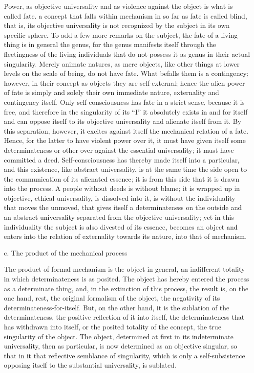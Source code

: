 Power, as objective universality and as violence against
the object is what is called fate.
a concept that falls within mechanism
in so far as fate is called blind,
that is, its objective universality is
not recognized by the subject in
its own specific sphere.
To add a few more remarks on the subject,
the fate of a living thing is in general the genus,
for the genus manifests itself through the fleetingness of
the living individuals that do not possess it as genus
in their actual singularity.
Merely animate natures, as mere objects,
like other things at lower levels
on the scale of being,
do not have fate.
What befalls them is a contingency;
however, in their concept as objects
they are self-external;
hence the alien power of fate is
simply and solely their own immediate nature,
externality and contingency itself.
Only self-consciousness has fate in a strict sense,
because it is free,
and therefore in the singularity of its “I”
it absolutely exists in and for itself
and can oppose itself to its objective universality
and alienate itself from it.
By this separation, however, it excites against itself
the mechanical relation of a fate.
Hence, for the latter to have violent power over it,
it must have given itself some determinateness or other
over against the essential universality;
it must have committed a deed.
Self-consciousness has thereby made itself into a particular,
and this existence, like abstract universality,
is at the same time the side open to
the communication of its alienated essence;
it is from this side that it is
drawn into the process.
A people without deeds is without blame;
it is wrapped up in objective, ethical universality,
is dissolved into it,
is without the individuality
that moves the unmoved,
that gives itself a determinateness on the outside
and an abstract universality separated
from the objective universality;
yet in this individuality the subject is also
divested of its essence,
becomes an object and enters into the relation of
externality towards its nature,
into that of mechanism.

c. The product of the mechanical process

The product of formal mechanism is
the object in general,
an indifferent totality
in which determinateness is as posited.
The object has hereby entered
the process as a determinate thing,
and, in the extinction of this process,
the result is, on the one hand, rest,
the original formalism of the object,
the negativity of its determinateness-for-itself.
But, on the other hand, it is
the sublation of the determinateness,
the positive reflection of it into itself,
the determinateness that has withdrawn into itself,
or the posited totality of the concept,
the true singularity of the object.
The object, determined at first
in its indeterminate universality,
then as particular, is now
determined as an objective singular,
so that in it that reflective semblance of singularity,
which is only a self-subsistence opposing itself
to the substantial universality,
is sublated.

